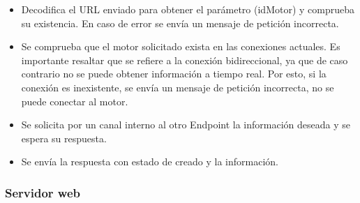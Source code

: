     \begin{itemize}
        \item Decodifica el URL enviado para obtener el parámetro (idMotor) y
            comprueba su existencia. En caso de error se envía un mensaje
            de petición incorrecta.
        \item Se comprueba que el motor solicitado exista en las conexiones
            actuales. Es importante resaltar que se refiere a la conexión
            bidireccional, ya que de caso contrario no se puede obtener información
            a tiempo real. Por esto, si la conexión es inexistente, se envía un
            mensaje de petición incorrecta, no se puede conectar al motor.
        \item Se solicita por un canal interno al otro Endpoint la información
            deseada y se espera su respuesta.
        \item Se envía la respuesta con estado de creado y la información.
    \end{itemize}

    \subsubsection{Servidor web}

